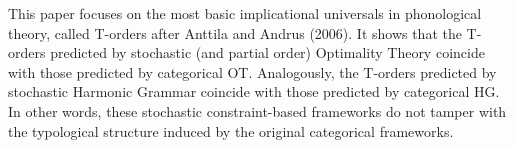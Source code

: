 This paper focuses on the most basic implicational universals in phonological theory, called T-orders after Anttila and Andrus (2006). It shows that the T-orders predicted by stochastic (and partial order) Optimality Theory coincide with those predicted by categorical OT. Analogously, the T-orders predicted by stochastic Harmonic Grammar coincide with those predicted by categorical HG. In other words, these stochastic constraint-based frameworks do not tamper with the typological structure induced by the original categorical frameworks.
